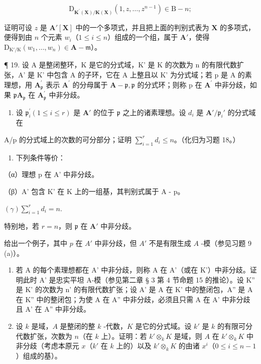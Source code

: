 \[
\mathrm{D} _ {\mathbf {K} ^ {\prime} (\mathbf {X}) / \mathbf {K} (\mathbf {X})} (1, z, \dots , z ^ {n - 1}) \in \mathrm{B} - n;
\]

证明可设 \(z\) 是 \(\mathbf{A}'[\mathbf{X}]\) 中的一个多项式，并且把上面的判别式表为 \(\mathbf{X}\) 的多项式，便得到由 \(n\) 个元素 \(w_{i}\)（\(1 \leqslant i \leqslant n\)）组成的一个组，属于 \(\mathbf{A}'\)，使得 \(\mathrm{D}_{\mathrm{K}'/\mathrm{K}}(w_1, \ldots, w_n) \in \mathbf{A} - \mathfrak{m}\)）。

¶ 19. 设 A 是整闭整环，K 是它的分式域，K' 是 K 的次数为 n 的有限代数扩张，A' 是 K' 中包含 A 的子环，它在 A 上整且以 K' 为分式域；若 p 是 A 的素理想，用 \(\mathbf{A}_{\mathfrak{p}}^{\prime}\) 表示 \(\mathbf{A}^{\prime}\) 的分母属于 \(\mathbf{A}-\mathfrak{p},\mathfrak{p}\) 的分式环；则称 p 在 \(\mathbf{A}^{\prime}\) 中非分歧，如果 \(\mathfrak{p}\mathbf{A}_{\mathfrak{p}}\) 在 \(\mathbf{A}_{\mathfrak{p}}^{\prime}\) 中非分歧。

\begin{enumerate}
\def\labelenumi{(\alph{enumi})}
\tightlist
\item
  设 \(\mathfrak{p}_i^{\prime}(1\leqslant i\leqslant r)\) 是 \(\mathbf{A}'\) 的位于 \(\mathfrak{p}\) 之上的诸素理想。设 \(d_{i}\) 是 \(\mathbf{A}' / \mathfrak{p}_i'\) 的分式域在
\end{enumerate}

A/p 的分式域上的次数的可分部分；证明 \(\sum_{i=1}^{r} d_i \leqslant n\)。（化归为习题 18。）

\begin{enumerate}
\def\labelenumi{(\alph{enumi})}
\setcounter{enumi}{1}
\tightlist
\item
  下列条件等价：
\end{enumerate}

（α）理想 p 在 A' 中非分歧。

（β）A' 包含 K' 在 K 上的一组基，其判别式属于 A - p。

\((\gamma)\sum_{i=1}^{r}d_{i}=n.\)

特别地，若 \(r = n\)，则 \(\mathfrak{p}\) 在 \(\mathbf{A}'\) 中非分歧。

给出一个例子，其中 \(p\) 在 \(A'\) 中非分歧，但 \(A'\) 不是有限生成 \(A\) -模（参见习题 9 (a)）。

\begin{enumerate}
\def\labelenumi{(\alph{enumi})}
\setcounter{enumi}{2}
\item
  若 A 的每个素理想都在 A' 中非分歧，则称 A 在 A'（或在 K'）中非分歧。证明此时 A' 是忠实平坦 A-模（参见第二章 § 3 第 4 节命题 15 的推论）。设 K'' 是 K' 的次数为 n' 的有限代数扩张；设 A' 是 A 在 K' 中的整闭包，A'' 是 A 在 K'' 中的整闭包；为使 A 在 A'' 中非分歧，必须且只需 A 在 A' 中非分歧且 A' 在 A'' 中非分歧。
\item
  设 \(k\) 是域，\(A\) 是整闭的整 \(k\) -代数，\(K\) 是它的分式域。设 \(k'\) 是 \(k\) 的有限可分代数扩张，次数为 \(n\)（在 \(k\) 上）。证明：若 \(k' \otimes_k K\) 是域，则 \(A\) 在 \(k' \otimes_k K\) 中非分歧（考虑本原元 \(x\)（\(k'\) 在 \(k\) 上的）以及 \(k' \otimes_k K\) 的由诸 \(x^i\)（\(0 \leqslant i \leqslant n - 1\)）组成的基）。
\end{enumerate}

